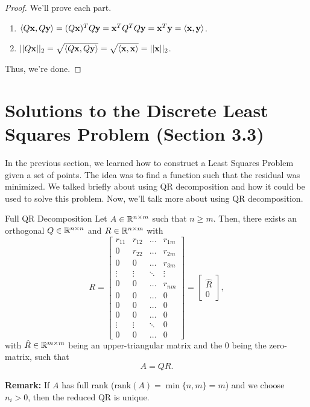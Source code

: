 \documentclass[letterpaper]{article}
\newcommand{\0}{\mathbf{0}}
\newcommand{\y}{\mathbf{y}}
\newcommand{\x}{\mathbf{x}}
\begin{document}
\begin{proof}
    We'll prove each part. 
    \begin{enumerate}
        \item $\cyclic{Q\x, Q\y} = (Q\x)^T Q\y = \x^T Q^T Q \y = \x^T \y = \cyclic{\x, \y}$. 
        \item $||Q\x||_2 = \sqrt{\cyclic{Q\x, Q\y}} = \sqrt{\cyclic{\x, \x}} = ||\x||_2$. 
    \end{enumerate}
    Thus, we're done.
\end{proof}


\section{Solutions to the Discrete Least Squares Problem (Section 3.3)}
In the previous section, we learned how to construct a Least Squares Problem given a set of points. The idea was to find a function such that the residual was minimized. We talked briefly about using QR decomposition and how it could be used to solve this problem. Now, we'll talk more about using QR decomposition. 

\begin{theorem}{Full QR Decomposition}{}
    Let $A \in \mathbb{R}^{n \times m}$ such that $n \geq m$. Then, there exists an orthogonal $Q \in \mathbb{R}^{n \times n}$ and $R \in \mathbb{R}^{n \times m}$ with 
    \[R = \begin{bmatrix}
        r_{11} & r_{12} & \hdots & r_{1m} \\ 
        0 & r_{22} & \hdots & r_{2m} \\
        0 & 0 & \hdots & r_{3m} \\ 
        \vdots & \vdots & \ddots & \vdots \\ 
        0 & 0 & \hdots & r_{nm} \\ 
        0 & 0 & \hdots & 0 \\ 
        0 & 0 & \hdots & 0 \\ 
        0 & 0 & \hdots & 0 \\ 
        \vdots & \vdots & \ddots & 0 \\ 
        0 & 0 & \hdots & 0
    \end{bmatrix} = \begin{bmatrix}
        \hat{R} \\ 0
    \end{bmatrix},\]
    with $\hat{R} \in \mathbb{R}^{m \times m}$ being an upper-triangular matrix and the 0 being the zero-matrix, such that \[A = QR.\]
\end{theorem}
\textbf{Remark:} If $A$ has full rank ($\text{rank}(A) = \min\{n, m\} = m$) and we choose $n_i > 0$, then the reduced QR is unique. 
\end{document}

